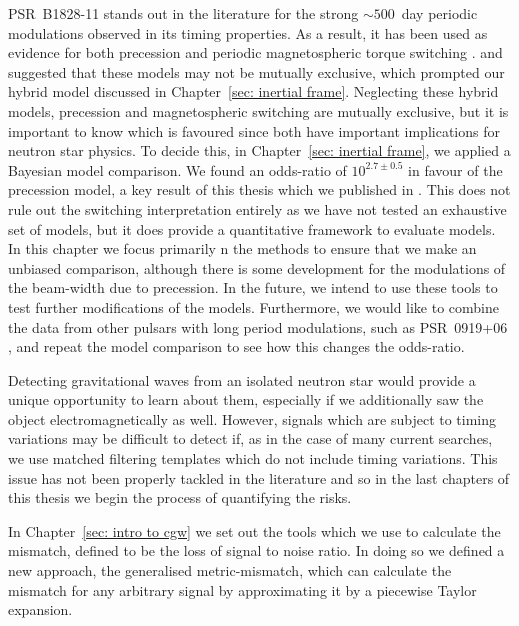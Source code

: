 \documentclass[twoside, 11pt]{thesis}
\begin{document}
PSR~B1828-11 stands out in the literature for the strong $\sim 500$~day
periodic modulations observed in its timing properties. As a result, it has
been used as evidence for both precession \citep{Stairs2000} and periodic
magnetospheric torque switching \citep{Lyne2010}. \citet{Jones2001} and
\citet{Cordes2013} suggested that these models may not be mutually exclusive,
which prompted our hybrid model discussed in Chapter~\ref{sec: inertial frame}.
Neglecting these hybrid models, precession and magnetospheric
switching are mutually exclusive, but it is important to know which is favoured
since both have important implications for neutron star physics. To decide
this, in Chapter~\ref{sec: inertial frame}, we applied a Bayesian model
comparison. We found an odds-ratio of $10^{2.7\pm 0.5}$ in favour of the
precession model, a key result of this thesis which we published in
\citet{Ashton2016}. This does not rule out the switching interpretation
entirely as we have not tested an exhaustive set of models, but it does provide
a quantitative framework to evaluate models. In this chapter  we focus
primarily n the methods to ensure that we make an unbiased comparison, although
there is some development for the modulations of the beam-width due to
precession. In the future, we intend to use these tools to test further
modifications of the models. Furthermore, we would like to combine the data
from other pulsars with long period modulations, such as PSR~0919+06
\citep{Perera2014}, and repeat the model comparison to see how this changes the
odds-ratio.

Detecting gravitational waves from an isolated neutron star would provide a
unique opportunity to learn about them, especially if we additionally saw the
object electromagnetically as well. However, signals which are subject to
timing variations may be difficult to detect if, as in the case of many current
searches, we use matched filtering templates which do not include timing
variations. This issue has not been properly tackled in the literature and so
in the last chapters of this thesis we begin the process of quantifying the
risks.

In Chapter~\ref{sec: intro to cgw} we set out the tools which we use to
calculate the mismatch, defined to be the loss of signal to noise ratio. In
doing so we defined a new approach, the generalised metric-mismatch, which can
calculate the mismatch for any arbitrary signal by approximating it by a
piecewise Taylor expansion.
\end{document}
